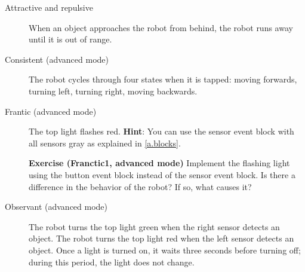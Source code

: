 \begin{description}
\item[Attractive and repulsive] When an object approaches the robot from
behind, the robot runs away until it is out of range.

\item[Consistent (advanced mode)] The robot cycles through four states when
it is tapped: moving forwards, turning left, turning right, moving
backwards.

\item[Frantic (advanced mode)] The top light flashes red. \textbf{Hint}:
You can use the sensor event block with all sensors gray as explained in
\cref{a.blocks}.

\textbf{Exercise (Franctic1, advanced mode)} Implement the flashing light using
the button event block instead of the sensor event block. Is there a
difference in the behavior of the robot? If so, what causes it?

\item[Observant (advanced mode)] The robot turns the top light green when the
right sensor detects an object. The robot turns the top light red when the
left sensor detects an object. Once a light is turned on, it waits three
seconds before turning off; during this period, the light does not change.

\end{description}
